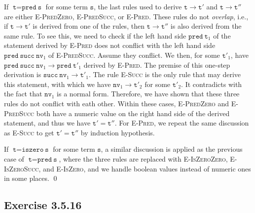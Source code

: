 \documentclass{article}
\newcommand{\code}[1]{\texttt{#1}}
\newcommand{\Ex}[1]{\subsection*{Exercise #1}}
\newcommand{\IsZero}[1]{\code{iszero}~#1}
\newcommand{\Pred}[1]{\code{pred}~#1}
\newcommand{\Rule}[1]{\textsc{#1}}
\newcommand{\Succ}[1]{\code{succ}~#1}
\begin{document}
If $\code t = \Pred{\code s}$ for some term $\code s$,
  the last rules used to derive
  $\code t \to \code t'$ and $\code t \to \code t''$ are
  either \Rule{E-PredZero}, \Rule{E-PredSucc}, or \Rule{E-Pred}.
These rules do not \emph{overlap},
  i.e., if $\code t \to \code t'$ is derived from one of the rules,
  then $\code t \to \code t''$ is also derived from the same rule.
To see this,
  we need to check if the left hand side $\Pred{\code t_1}$ of the statement
  derived by \Rule{E-Pred} does not conflict with the left hand side
  $\Pred{\Succ{\code{nv}_1}}$ of \Rule{E-PredSucc}.
Assume they conflict.
We then, for some $\code t'_1$,
  have $\Pred{\Succ{\code{nv}_1}} \to \Pred{\code t'_1}$
  derived by \Rule{E-Pred}.
The premise of this one-step derivation is $\Succ{\code{nv}_1} \to \code t'_1$.
The rule \Rule{E-Succ} is the only rule that may derive this statement,
  with which we have $\code{nv}_1 \to \code t'_2$ for some $\code t'_2$.
It contradicts with the fact that $\code{nv}_1$ is a normal form.
Therefore, we have shown that these three rules do not conflict with eath other.
Within these cases,
  \Rule{E-PredZero} and \Rule{E-PredSucc} both have a numeric value
  on the right hand side of the derived statement,
  and thus we have $\code t' = \code t''$.
For \Rule{E-Pred},
  we repeat the same discussion as \Rule{E-Succ} to get
  $\code t' = \code t''$ by induction hypothesis.

If $\code t = \IsZero{\code s}$ for some term $\code s$,
  a similar discussion is applied as the previous case of $\code t = \Pred{\code s}$,
  where the three rules are replaced with
  \Rule{E-IsZeroZero}, \Rule{E-IsZeroSucc}, and \Rule{E-IsZero},
  and we handle boolean values instead of numeric ones in some places. \qed

\Ex{3.5.16}
\end{document}
